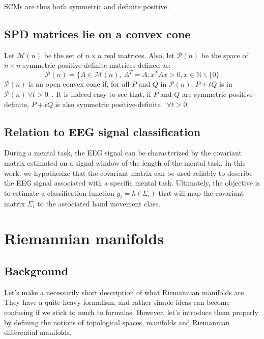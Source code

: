 \documentclass[a4paper,11pt]{report}
\begin{document}
\noindent SCMs are thus both symmetric and definite positive.

\section{SPD matrices lie on a convex cone}

Let $\mathcal{M}(n)$ be the set of $n \times n$ real matrices.
Also, let $\mathcal{P}(n)$ be the space of $n \times n$ symmetric positive-definite matrices defined as:
\begin{equation}
    \mathcal{P}(n) = \{ A \in \mathcal{M}(n), \ A^T = A, x^T A x > 0, x \in \mathbb{N} \backslash \{0\}
\end{equation}
$\mathcal{P}(n)$ is an open convex cone if, for all $P$ and $Q$ in $\mathcal{P}(n)$,
$P + tQ$ is in $\mathcal{P}(n) \ \forall t > 0$~\citep{doi:10.1137/S0895479803436937}.
It is indeed easy to see that, if $P$ and $Q$ are symmetric positive-definite, 
$P + tQ$ is also symmetric positive-definite \ $\forall t > 0$.

\section{Relation to EEG signal classification}

During a mental task, the EEG signal can be characterized by the covariant matrix estimated on a signal window of the length of the mental task. In this work, we hypothesize that the covariant matrix can be used reliably to describe the EEG signal associated with a specific mental task. Ultimately, the objective is to estimate a classification function $y_i = h(\Sigma_{i})$ that will map the covariant matrix $\Sigma_{i}$ to the associated hand movement class.


\chapter{Riemannian manifolds}

\section{Background}

Let's make a necessarily short description of what Riemannian manifolds are. They have a quite heavy
formalism, and rather simple ideas can become confusing if we stick to much to formulas. However, let's introduce them
properly by defining the notions of topological spaces, manifolds and Riemannian differential manifolds.
\end{document}
